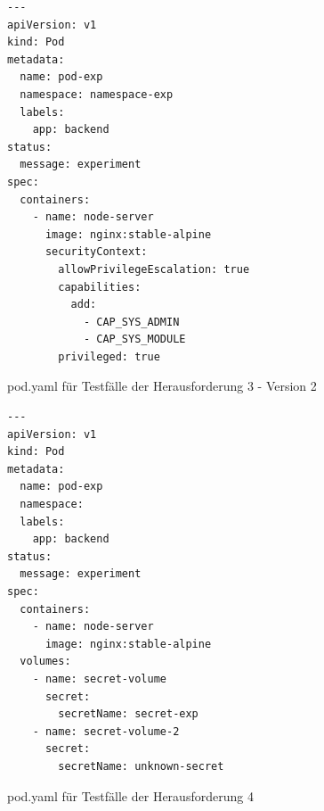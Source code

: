 \begin{listing}[htp]
  \begin{verbatim}
---
apiVersion: v1
kind: Pod
metadata:
  name: pod-exp
  namespace: namespace-exp
  labels:
    app: backend
status:    
  message: experiment 
spec:
  containers:
    - name: node-server
      image: nginx:stable-alpine
      securityContext:
        allowPrivilegeEscalation: true
        capabilities:
          add:
            - CAP_SYS_ADMIN
            - CAP_SYS_MODULE
        privileged: true
  \end{verbatim}
  \caption{pod.yaml für Testfälle der Herausforderung 3 - Version 2}
  \label{lst:pod-yaml-file-3-2}
\end{listing}

\begin{listing}[htp]
  \begin{verbatim}
---
apiVersion: v1
kind: Pod
metadata:
  name: pod-exp
  namespace: 
  labels:
    app: backend
status:    
  message: experiment  
spec:
  containers:
    - name: node-server
      image: nginx:stable-alpine
  volumes:
    - name: secret-volume
      secret:
        secretName: secret-exp
    - name: secret-volume-2
      secret:
        secretName: unknown-secret
  \end{verbatim}
  \caption{pod.yaml für Testfälle der Herausforderung 4}
  \label{lst:pod-yaml-file-4}
\end{listing}

